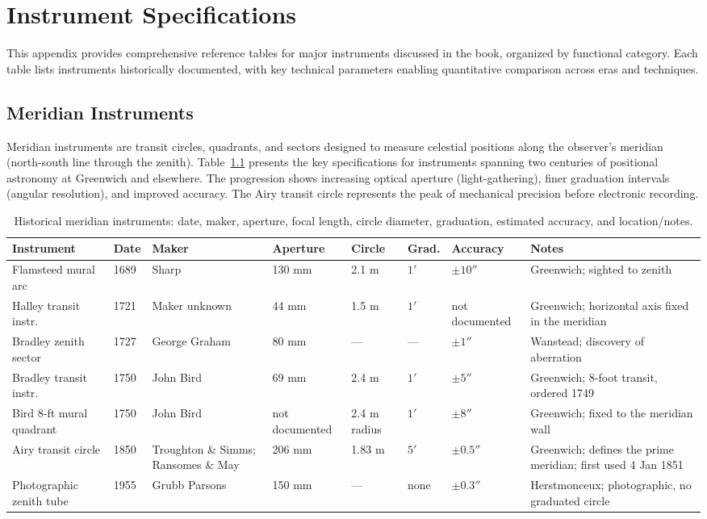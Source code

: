 \chapter{Instrument Specifications}
\label{app:instrument-specs}

This appendix provides comprehensive reference tables for major instruments discussed in the book, organized by functional category. Each table lists instruments historically documented, with key technical parameters enabling quantitative comparison across eras and techniques.

\section{Meridian Instruments}

Meridian instruments are transit circles, quadrants, and sectors designed to measure celestial positions along the observer's meridian (north-south line through the zenith). Table~\ref{tab:meridian-instruments} presents the key specifications for instruments spanning two centuries of positional astronomy at Greenwich and elsewhere. The progression shows increasing optical aperture (light-gathering), finer graduation intervals (angular resolution), and improved accuracy. The Airy transit circle represents the peak of mechanical precision before electronic recording.

\begin{table}
  \centering
  \caption{Historical meridian instruments: date, maker, aperture, focal length, circle diameter, graduation, estimated accuracy, and location/notes.}
  \label{tab:meridian-instruments}
  \begin{tabularx}{\linewidth}{llXlllXX}
    \toprule
    \textbf{Instrument} & \textbf{Date} & \textbf{Maker} & \textbf{Aperture} & \textbf{Circle} & \textbf{Grad.} & \textbf{Accuracy} & \textbf{Notes} \\
    \midrule
    Flamsteed mural arc & 1689 & Sharp & 130 mm & 2.1 m & $1'$ & $\pm 10''$ & Greenwich; sighted to zenith \\
    Halley transit instr. & 1721 & Maker unknown & 44 mm & 1.5 m & $1'$ & not documented & Greenwich; horizontal axis fixed in the meridian \\
    Bradley zenith sector & 1727 & George Graham & 80 mm & — & — & $\pm 1''$ & Wanstead; discovery of aberration \\
    Bradley transit instr. & 1750 & John Bird & 69 mm & 2.4 m & $1'$ & $\pm 5''$ & Greenwich; 8-foot transit, ordered 1749 \\
    Bird 8-ft mural quadrant & 1750 & John Bird & not documented & 2.4 m radius & $1'$ & $\pm 8''$ & Greenwich; fixed to the meridian wall \\
    Airy transit circle & 1850 & Troughton \& Simms; Ransomes \& May & 206 mm & 1.83 m & $5'$ & $\pm 0.5''$ & Greenwich; defines the prime meridian; first used 4 Jan 1851 \\
    Photographic zenith tube & 1955 & Grubb Parsons & 150 mm & — & none & $\pm 0.3''$ & Herstmonceux; photographic, no graduated circle \\
    \bottomrule
  \end{tabularx}
\end{table}

